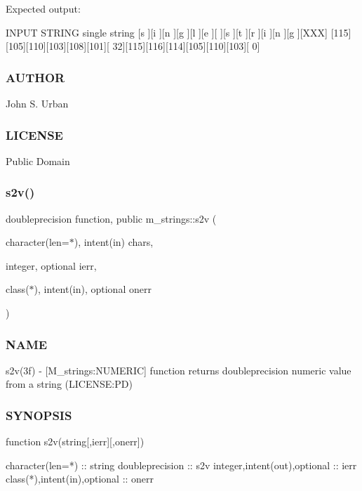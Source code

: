 Expected output\+: \begin{DoxyVerb}INPUT STRING single string
[s  ][i  ][n  ][g  ][l  ][e  ][   ][s  ][t  ][r  ][i  ][n  ][g  ][XXX]
[115][105][110][103][108][101][ 32][115][116][114][105][110][103][  0]
\end{DoxyVerb}


\subsubsection*{A\+U\+T\+H\+OR}

John S. Urban \subsubsection*{L\+I\+C\+E\+N\+SE}

Public Domain \mbox{\label{namespacem__strings_ae0e2fe7c93e581402a74a7b59e5bb07f}} 
\subsubsection{\texorpdfstring{s2v()}{s2v()}}
{\footnotesize\ttfamily doubleprecision function, public m\+\_\+strings\+::s2v (\begin{DoxyParamCaption}\item[{character(len=$\ast$), intent(in)}]{chars,  }\item[{integer, optional}]{ierr,  }\item[{class($\ast$), intent(in), optional}]{onerr }\end{DoxyParamCaption})}



\subsubsection*{N\+A\+ME}

s2v(3f) -\/ \mbox{[}M\+\_\+strings\+:N\+U\+M\+E\+R\+IC\mbox{]} function returns doubleprecision numeric value from a string (L\+I\+C\+E\+N\+SE\+:PD) 

\subsubsection*{S\+Y\+N\+O\+P\+S\+IS}

\begin{DoxyVerb}function s2v(string[,ierr][,onerr])

 character(len=*)             :: string
 doubleprecision              :: s2v
 integer,intent(out),optional :: ierr
 class(*),intent(in),optional :: onerr
\end{DoxyVerb}
